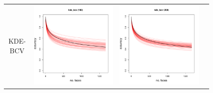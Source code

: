 \documentclass[twoside,11pt]{article}
\newenvironment{myfont}{\fontfamily{phv}\selectfont}{\par}
\begin{document}
\begin{figure}
\begin{tabular}{cccc}
\begin{myfont}KDE-BCV\end{myfont} & 
\includegraphics[scale = 0.2, clip = true, trim = 0 0 0 0.6in, valign=c]{repeat_100_kde_bcv.pdf} &
\includegraphics[scale = 0.2, clip = true, trim = 0 0 0 0.6in, valign=c]{repeat_200_kde_bcv.pdf} &

\end{tabular}
\end{figure}
\end{document}
